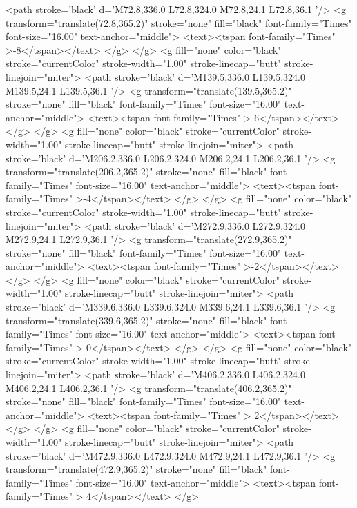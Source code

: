 	<path stroke='black'  d='M72.8,336.0 L72.8,324.0 M72.8,24.1 L72.8,36.1  '/>	<g transform="translate(72.8,365.2)" stroke="none" fill="black" font-family="Times" font-size="16.00"  text-anchor="middle">
		<text><tspan font-family="Times" >-8</tspan></text>
	</g>
</g>
<g fill="none" color="black" stroke="currentColor" stroke-width="1.00" stroke-linecap="butt" stroke-linejoin="miter">
	<path stroke='black'  d='M139.5,336.0 L139.5,324.0 M139.5,24.1 L139.5,36.1  '/>	<g transform="translate(139.5,365.2)" stroke="none" fill="black" font-family="Times" font-size="16.00"  text-anchor="middle">
		<text><tspan font-family="Times" >-6</tspan></text>
	</g>
</g>
<g fill="none" color="black" stroke="currentColor" stroke-width="1.00" stroke-linecap="butt" stroke-linejoin="miter">
	<path stroke='black'  d='M206.2,336.0 L206.2,324.0 M206.2,24.1 L206.2,36.1  '/>	<g transform="translate(206.2,365.2)" stroke="none" fill="black" font-family="Times" font-size="16.00"  text-anchor="middle">
		<text><tspan font-family="Times" >-4</tspan></text>
	</g>
</g>
<g fill="none" color="black" stroke="currentColor" stroke-width="1.00" stroke-linecap="butt" stroke-linejoin="miter">
	<path stroke='black'  d='M272.9,336.0 L272.9,324.0 M272.9,24.1 L272.9,36.1  '/>	<g transform="translate(272.9,365.2)" stroke="none" fill="black" font-family="Times" font-size="16.00"  text-anchor="middle">
		<text><tspan font-family="Times" >-2</tspan></text>
	</g>
</g>
<g fill="none" color="black" stroke="currentColor" stroke-width="1.00" stroke-linecap="butt" stroke-linejoin="miter">
	<path stroke='black'  d='M339.6,336.0 L339.6,324.0 M339.6,24.1 L339.6,36.1  '/>	<g transform="translate(339.6,365.2)" stroke="none" fill="black" font-family="Times" font-size="16.00"  text-anchor="middle">
		<text><tspan font-family="Times" > 0</tspan></text>
	</g>
</g>
<g fill="none" color="black" stroke="currentColor" stroke-width="1.00" stroke-linecap="butt" stroke-linejoin="miter">
	<path stroke='black'  d='M406.2,336.0 L406.2,324.0 M406.2,24.1 L406.2,36.1  '/>	<g transform="translate(406.2,365.2)" stroke="none" fill="black" font-family="Times" font-size="16.00"  text-anchor="middle">
		<text><tspan font-family="Times" > 2</tspan></text>
	</g>
</g>
<g fill="none" color="black" stroke="currentColor" stroke-width="1.00" stroke-linecap="butt" stroke-linejoin="miter">
	<path stroke='black'  d='M472.9,336.0 L472.9,324.0 M472.9,24.1 L472.9,36.1  '/>	<g transform="translate(472.9,365.2)" stroke="none" fill="black" font-family="Times" font-size="16.00"  text-anchor="middle">
		<text><tspan font-family="Times" > 4</tspan></text>
	</g>
